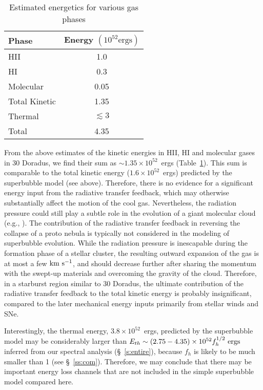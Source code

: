 \documentclass[usenatbib]{mnras}
\def\xs{30 Doradus}
\begin{document}
\begin{table}
\caption{Estimated energetics for various gas phases}
\begin{tabular}{lc}
\hline \hline 
Phase & Energy $\left(10^{52} \mathrm{ergs}\right)$ \\
\hline 
HII & 1.0 \\
HI & 0.3 \\
Molecular & 0.05 \\
Total Kinetic & 1.35 \\
\hline 
Thermal & $\lesssim 3$ \\
\hline
Total & 4.35 \\
\hline
\end{tabular}
\label{t:energy}

\end{table}

From the above estimates of the kinetic energies in HII, HI and molecular gases in \xs, we find their sum as $\sim 1.35\times 10^{52}$~ergs (Table~\ref{t:energy}). This sum is comparable to the total kinetic energy ($1.6 \times 10^{52}$~ergs) predicted by the superbubble model (see above). Therefore, there is no evidence for a significant energy input from the radiative transfer feedback, which may otherwise substantially affect the motion of the cool gas. Nevertheless, the radiation pressure could still play a subtle role in the evolution of a giant molecular cloud (e.g., \citealt{Elmegreen, Scoville}). The contribution of the radiative transfer feedback in reversing the collapse of a proto nebula is typically not considered in the modeling of superbubble evolution. While the radiation pressure is inescapable during the formation phase of a stellar cluster, the resulting outward expansion of the gas is at most a few ${\rm km~s^{-1}}$, and should decrease further after sharing the momentum with the swept-up materials and overcoming the gravity of the cloud. Therefore, in a starburst region similar to \xs, the ultimate contribution of the radiative transfer feedback to the total kinetic energy is probably insignificant, compared to the later mechanical energy inputs primarily from stellar winds and SNe.

Interestingly, the thermal energy, $3.8 \times 10^{52}$~ergs, predicted by the superbubble model may be  considerably larger than $E_{th} \sim (2.75-4.35) \times 10^{52} f_h^{1/2}{\rm~ergs}$ inferred from our spectral analysis (\S~\ref{s:entire}), because $f_{h}$ is likely to be much smaller than 1 (see \S~\ref{ss:com}). Therefore, we may conclude that there may be important energy loss channels that are not included in the simple superbubble model compared here. 
\end{document}
